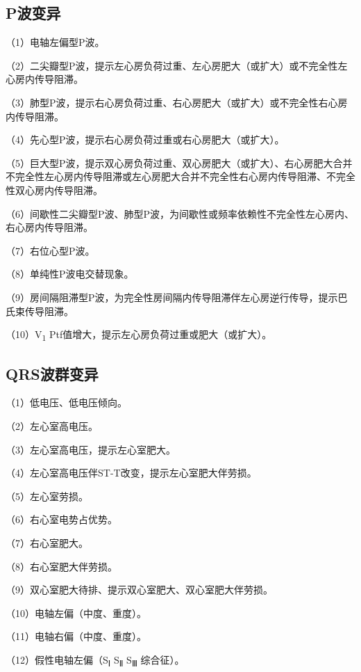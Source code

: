 \protect\hypertarget{text00057.htmlux5cux23subid681}{}{}

\subsection{P波变异}

（1）电轴左偏型P波。

（2）二尖瓣型P波，提示左心房负荷过重、左心房肥大（或扩大）或不完全性左心房内传导阻滞。

（3）肺型P波，提示右心房负荷过重、右心房肥大（或扩大）或不完全性右心房内传导阻滞。

（4）先心型P波，提示右心房负荷过重或右心房肥大（或扩大）。

（5）巨大型P波，提示双心房负荷过重、双心房肥大（或扩大）、右心房肥大合并不完全性左心房内传导阻滞或左心房肥大合并不完全性右心房内传导阻滞、不完全性双心房内传导阻滞。

（6）间歇性二尖瓣型P波、肺型P波，为间歇性或频率依赖性不完全性左心房内、右心房内传导阻滞。

（7）右位心型P波。

（8）单纯性P波电交替现象。

（9）房间隔阻滞型P波，为完全性房间隔内传导阻滞伴左心房逆行传导，提示巴氏束传导阻滞。

（10）V\textsubscript{1} Ptf值增大，提示左心房负荷过重或肥大（或扩大）。

\protect\hypertarget{text00057.htmlux5cux23subid682}{}{}

\subsection{QRS波群变异}

（1）低电压、低电压倾向。

（2）左心室高电压。

（3）左心室高电压，提示左心室肥大。

（4）左心室高电压伴ST-T改变，提示左心室肥大伴劳损。

（5）左心室劳损。

（6）右心室电势占优势。

（7）右心室肥大。

（8）右心室肥大伴劳损。

（9）双心室肥大待排、提示双心室肥大、双心室肥大伴劳损。

（10）电轴左偏（中度、重度）。

（11）电轴右偏（中度、重度）。

（12）假性电轴左偏（S\textsubscript{Ⅰ} S\textsubscript{Ⅱ}
S\textsubscript{Ⅲ} 综合征）。

